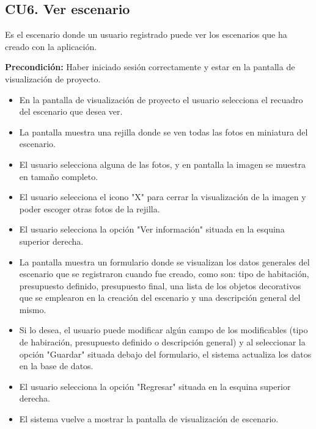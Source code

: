 \subsection{CU6. Ver escenario}\par
Es el escenario donde un usuario registrado puede ver los escenarios que ha creado con la aplicación.\par
\textbf{Precondición:} Haber iniciado sesión correctamente y estar en la pantalla de visualización de proyecto.\par
\begin{itemize}
	\item En la pantalla de visualización de proyecto el usuario selecciona el recuadro del escenario que desea ver.
	\item La pantalla muestra una rejilla donde se ven todas las fotos en miniatura del escenario.
	\item El usuario selecciona alguna de las fotos, y en pantalla la imagen se muestra en tamaño completo.
	\item El usuario selecciona el icono "X" para cerrar la visualización de la imagen y poder escoger otras fotos de la rejilla.
	\item El usuario selecciona la opción "Ver información" situada en la esquina superior derecha.
	\item La pantalla muestra un formulario donde se visualizan los datos generales del escenario que se registraron cuando fue creado, como son: tipo de habitación, presupuesto definido, presupuesto final, una lista de los objetos decorativos que se emplearon en la creación del escenario y una descripción general del mismo.
	\item Si lo desea, el usuario puede modificar algún campo de los modificables (tipo de habiración, presupuesto definido o descripción general) y al seleccionar la opción "Guardar" situada debajo del formulario, el sistema actualiza los datos en la base de datos.
	\item El usuario selecciona la opción "Regresar" situada en la esquina superior derecha.
	\item El sistema vuelve a mostrar la pantalla de visualización de escenario.
\end{itemize}


